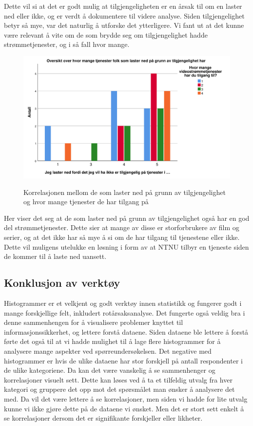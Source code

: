 Dette vil si at det er godt mulig at tilgjengeligheten er en årsak til om en laster ned eller ikke, og er verdt å dokumentere til videre analyse. Siden tilgjengelighet betyr så mye, var det naturlig å utforske det ytterligere. Vi fant ut at det kunne være relevant å vite om de som brydde seg om tilgjengelighet hadde strømmetjenester, og i så fall hvor mange.

\begin{figure}[H]
    \centering
    \includegraphics[scale=0.45]{case_1/bilder/tilgjengelighet_antallstromming.pdf}
    \label{fig:tilgjengelighet_antallstromming}
    \caption[Tilgjengelighet vs antall strømmetjenester]{Korrelasjonen mellom de som laster ned på grunn av tilgjengelighet og hvor mange tjenester de har tilgang på}
\end{figure}

Her viser det seg at de som laster ned på grunn av tilgjengelighet også har en god del strømmetjenester. Dette sier at mange av disse er storforbrukere av film og serier, og at det ikke har så mye å si om de har tilgang til tjenestene eller ikke. Dette vil muligens utelukke en løsning i form av at NTNU tilbyr en tjeneste siden de kommer til å laste ned uansett.

\subsection{Konklusjon av verktøy}
Histogrammer er et velkjent og godt verktøy innen statistikk og fungerer godt i mange forskjellige felt, inkludert rotårsaksanalyse.  Det fungerte også veldig bra i denne sammenhengen for å visualisere problemer knyttet til informasjonssikkerhet, og lettere forstå dataene. Siden dataene ble lettere å forstå førte det også til at vi hadde mulighet til å lage flere histogrammer for å analysere mange aspekter ved spørreundersøkelsen. Det negative med histogrammer er hvis de ulike dataene har stor forskjell på antall respondenter i de ulike kategoriene. Da kan det være vanskelig å se sammenhenger og korrelasjoner visuelt sett. Dette kan løses ved å ta et tilfeldig utvalg fra hver kategori og gruppere det opp mot det spørsmålet man ønsker å analysere det med. Da vil det være lettere å se korrelasjoner, men siden vi hadde for lite utvalg kunne vi ikke gjøre dette på de dataene vi ønsket. Men det er stort sett enkelt å se korrelasjoner dersom det er signifikante forskjeller eller likheter.

